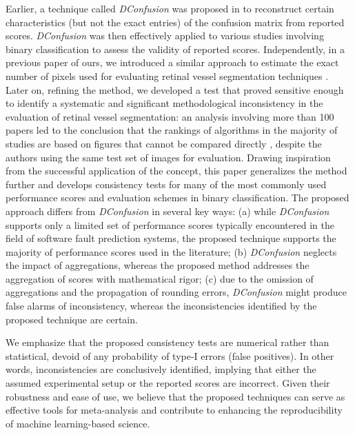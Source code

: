 \documentclass[5p, final]{elsarticle}
\begin{document}
Earlier, a technique called \emph{DConfusion} was proposed in \cite{dconfusion} to reconstruct certain characteristics (but not the exact entries) of the confusion matrix from reported scores. \emph{DConfusion} was then effectively applied to various studies involving binary classification \cite{errorsml} to assess the validity of reported scores.
Independently, in a previous paper of ours, we introduced a similar approach to estimate the exact number of pixels used for evaluating retinal vessel segmentation techniques \cite{vesselsegm}. Later on, refining the method, we developed a test that proved sensitive enough to identify a systematic and significant methodological inconsistency in the evaluation of retinal vessel segmentation: an analysis involving more than 100 papers led to the conclusion that the rankings of algorithms in the majority of studies are based on figures that cannot be compared directly \cite{vessel}, despite the authors using the same test set of images for evaluation. Drawing inspiration from the successful application of the concept, this paper generalizes the method further and develops consistency tests for many of the most commonly used performance scores and evaluation schemes in binary classification.
The proposed approach differs from \emph{DConfusion} \cite{dconfusion} in several key ways: (a) while \emph{DConfusion} supports only a limited set of performance scores typically encountered in the field of software fault prediction systems, the proposed technique supports the majority of performance scores used in the literature; (b) \emph{DConfusion} neglects the impact of aggregations, whereas the proposed method addresses the aggregation of scores with mathematical rigor; (c) due to the omission of aggregations and the propagation of rounding errors, \emph{DConfusion} might produce false alarms of inconsistency, whereas the inconsistencies identified by the proposed technique are certain.

We emphasize that the proposed consistency tests are numerical rather than statistical, devoid of any probability of type-I errors (false positives). In other words, inconsistencies are conclusively identified, implying that either the assumed experimental setup or the reported scores are incorrect. Given their robustness and ease of use, we believe that the proposed techniques can serve as effective tools for meta-analysis and contribute to enhancing the reproducibility of machine learning-based science.
\end{document}
